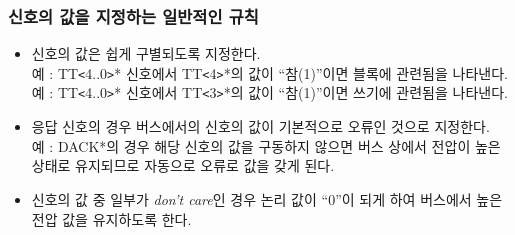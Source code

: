 \subsubsection{신호의 값을 지정하는 일반적인 규칙}
\begin{itemize}
  \item 신호의 값은 쉽게 구별되도록 지정한다. \\
	예 : TT{\tt <}4..0{\tt >}* 신호에서 TT{\tt <}4{\tt >}*의 값이
	``참(1)''이면 블록에 관련됨을 나타낸다.\\
	예 : TT{\tt <}4..0{\tt >}* 신호에서 TT{\tt <}3{\tt >}*의 값이
	``참(1)''이면 쓰기에 관련됨을 나타낸다.
  \item 응답 신호의 경우 버스에서의 신호의 값이 기본적으로 오류인 것으로 지정한다. \\
	예 : DACK*의 경우 해당 신호의 값을 구동하지 않으면 버스 상에서 전압이 높은 상태로
	유지되므로 자동으로 오류로 값을 갖게 된다.
  \item 신호의 값 중 일부가 {\it don't care\/}인 경우 논리 값이 ``0''이 되게 하여
	버스에서 높은 전압 값을 유지하도록 한다.
\end{itemize}
